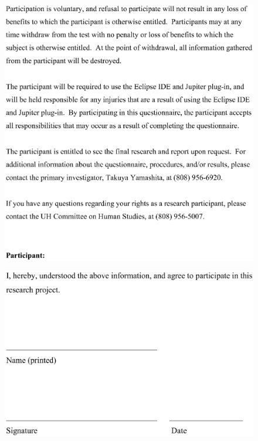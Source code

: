 \begin{figure}[htbp]
  \centering
  \includegraphics[width=1.0\textwidth]{figures/JupiterQuestionnaire_2.eps}
  \label{fig:JupiterQuestionnaire_2}
\end{figure}

\begin{figure}[htbp]
  \centering
  \includegraphics[width=1.0\textwidth]{figures/JupiterQuestionnaire_3.eps}
  \label{fig:JupiterQuestionnaire_3}
\end{figure}

